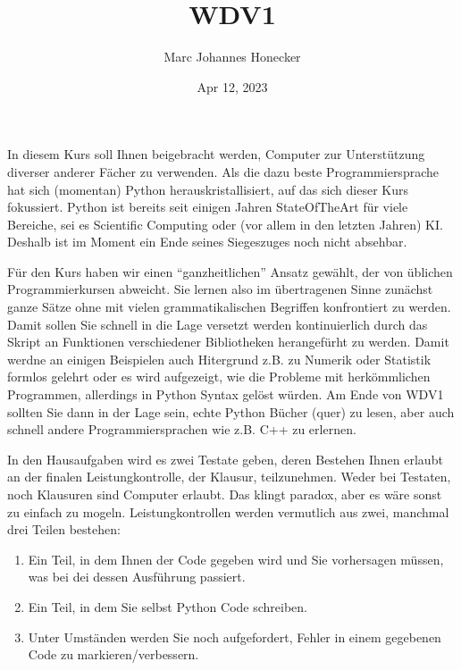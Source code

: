 \documentclass[letterpaper,10pt,english]{jupyterBook}
\title{WDV1}
\date{Apr 12, 2023}
\author{Marc Johannes Honecker}
\begin{document}
\pagestyle{empty}
\sphinxmaketitle
\pagestyle{plain}
\sphinxtableofcontents
\pagestyle{normal}
\label{\detokenize{intro::doc}}


\sphinxAtStartPar
In diesem Kurs soll Ihnen beigebracht werden, Computer zur Unterstützung diverser anderer Fächer zu verwenden. Als die dazu beste
Programmiersprache hat sich (momentan) Python herauskristallisiert, auf das sich dieser Kurs fokussiert. Python ist bereits seit
einigen Jahren State\sphinxhyphen{}Of\sphinxhyphen{}The\sphinxhyphen{}Art für viele Bereiche, sei es Scientific Computing oder (vor allem in den letzten Jahren) KI.
Deshalb ist im Moment ein Ende seines Siegeszuges noch nicht absehbar.

\sphinxAtStartPar
Für den Kurs haben wir einen “ganzheitlichen” Ansatz gewählt, der von üblichen Programmierkursen abweicht. Sie lernen also im
übertragenen Sinne zunächst ganze Sätze ohne mit vielen grammatikalischen Begriffen konfrontiert zu werden. Damit sollen Sie
schnell in die Lage versetzt werden kontinuierlich durch das Skript an Funktionen verschiedener Bibliotheken herangefürht zu
werden. Damit werdne an einigen Beispielen auch Hitergrund z.B. zu Numerik oder Statistik formlos gelehrt oder es wird aufgezeigt,
wie die Probleme mit herkömmlichen Programmen, allerdings in Python Syntax gelöst würden. Am Ende von WDV\sphinxhyphen{}1 sollten Sie dann in
der Lage sein, echte Python Bücher (quer) zu lesen, aber auch schnell andere Programmiersprachen wie z.B. C++ zu erlernen.

\sphinxAtStartPar
In den Hausaufgaben wird es zwei Testate geben, deren Bestehen Ihnen erlaubt an der finalen Leistungkontrolle, der Klausur,
teilzunehmen. Weder bei Testaten, noch Klausuren sind Computer erlaubt. Das klingt paradox, aber es wäre sonst zu einfach zu
mogeln. Leistungkontrollen werden vermutlich aus zwei, manchmal drei Teilen bestehen:
\begin{enumerate}
%
\item {} 
\sphinxAtStartPar
Ein Teil, in dem Ihnen der Code gegeben wird und Sie vorhersagen müssen, was bei dei dessen Ausführung passiert.

\item {} 
\sphinxAtStartPar
Ein Teil, in dem Sie selbst Python Code schreiben.

\item {} 
\sphinxAtStartPar
Unter Umständen werden Sie noch aufgefordert, Fehler in einem gegebenen Code zu markieren/verbessern.

\end{enumerate}
\end{document}
